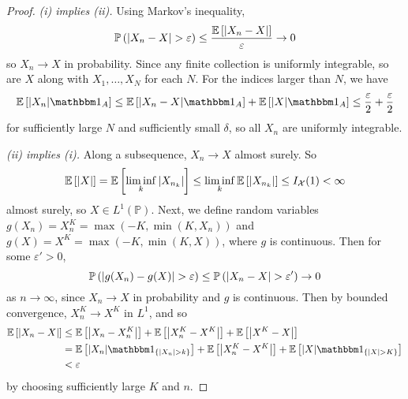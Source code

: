 \begin{proof}
	\emph{(i) implies (ii).}
	Using Markov's inequality,
	\[ \mathbb{P}\left({\abs{X_n - X} > \varepsilon}\right) \leq \frac{\mathbb{E}\left[{\abs{X_n - X}}\right]}{\varepsilon} \to 0 \]
	so \( X_n \to X \) in probability.
	Since any finite collection is uniformly integrable, so are \( X \) along with \( X_1, \dots, X_N \) for each \( N \).
	For the indices larger than \( N \), we have
	\[ \expect{\abs{X_n} \mathbbm 1_A} \leq \expect{\abs{X_n - X} \mathbbm 1_A} + \expect{\abs{X} \mathbbm 1_A} \leq \frac{\varepsilon}{2} + \frac{\varepsilon}{2} \]
	for sufficiently large \( N \) and sufficiently small \( \delta \), so all \( X_n \) are uniformly integrable.

	\emph{(ii) implies (i).}
	Along a subsequence, \( X_n \to X \) almost surely.
	So
	\[ \mathbb{E}\left[{\abs{X}}\right] = \mathbb{E}\left[{\liminf_k \abs{X_{n_k}}}\right] \leq \liminf_k \mathbb{E}\left[{\abs{X_{n_k}}}\right] \leq I_{\mathcal X}(1) < \infty \]
	almost surely, so \( X \in L^1(\mathbb P) \).
	Next, we define random variables \( g(X_n) = X_n^K = \max(-K, \min(K, X_n)) \) and \( g(X) = X^K = \max(-K, \min(K, X)) \), where \( g \) is continuous.
	Then for some \( \varepsilon' > 0 \),
	\[ \mathbb{P}\left({\abs{g(X_n) - g(X)} > \varepsilon}\right) \leq \mathbb{P}\left({\abs{X_n - X} > \varepsilon'}\right) \to 0 \]
	as \( n \to \infty \), since \( X_n \to X \) in probability and \( g \) is continuous.
	Then by bounded convergence, \( X_n^K \to X^K \) in \( L^1 \), and so
	\begin{align*}
		\expect{\abs{X_n - X}} &\leq \expect{\abs{X_n - X_n^K}} + \expect{\abs{X_n^K - X^K}} + \expect{\abs{X^K - X}} \\
		&= \expect{\abs{X_n} \mathbbm 1_{\qty{\abs{X_n} > k}}} + \expect{\abs{X_n^K - X^K}} + \expect{\abs{X}\mathbbm 1_{\qty{\abs{X} > K}}} \\
		&< \varepsilon
	\end{align*}
	by choosing sufficiently large \( K \) and \( n \).
\end{proof}
